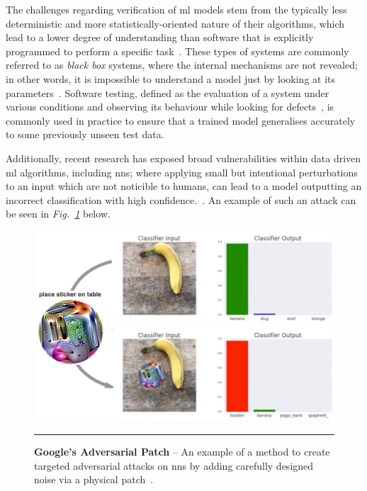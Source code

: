 The challenges regarding verification of \gls{ml} models stem from the typically less deterministic and more statistically-oriented nature of their algorithms, which
lead to a lower degree of understanding than software that is explicitly programmed to perform a specific task~\citep{bishop}. These types of systems are
commonly referred to as \textit{black box} systems, where the internal mechanisms are not revealed; in other words, it is impossible to understand a model just by
looking at its parameters~\citep{molnar2019}.
Software testing, defined as the evaluation of a system under various conditions and observing its behaviour while looking for defects~\citep{pereira}, is
commonly used in practice to ensure that a trained model generalises accurately to some previously unseen test data.

Additionally, recent research has exposed broad vulnerabilities within data driven \gls{ml} algorithms, including \Glspl{nn}; where applying 
small but intentional perturbations to an input which are not noticible to humans,
can lead to a model outputting an incorrect classification with high confidence.~\citep{goodfellow}.
An example of such an attack can be seen in \textit{Fig.~\ref{fig:adversarialpatch}} below.

\begin{figure}[H]
	\centering
        \includegraphics[width=1.0\textwidth]{media/introduction/sticker.png}
        \rule{35em}{0.5pt}
        \caption[Google's Aversarial Patch]{\textbf{Google's Adversarial Patch} -- An example of a method to create targeted adversarial attacks on \glspl{nn} by adding carefully designed noise via a physical patch~\citep{brown2018}.}\label{fig:adversarialpatch}
\end{figure}

